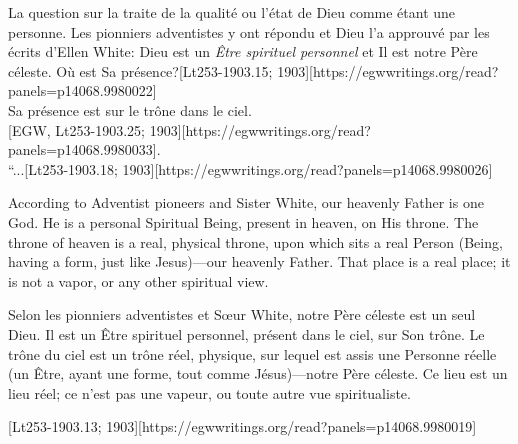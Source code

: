 La question sur la  traite de la qualité ou l'état de Dieu comme étant une personne. Les pionniers adventistes y ont répondu et Dieu l'a approuvé par les écrits d'Ellen White: Dieu est un \textit{Être spirituel personnel} et Il est notre Père céleste. Où est Sa présence?[Lt253-1903.15; 1903][https://egwwritings.org/read?panels=p14068.9980022] \\
Sa présence est sur le trône dans le ciel. \\
[EGW, Lt253-1903.25; 1903][https://egwwritings.org/read?panels=p14068.9980033]. \\
“...[Lt253-1903.18; 1903][https://egwwritings.org/read?panels=p14068.9980026]


According to Adventist pioneers and Sister White, our heavenly Father is one God. He is a personal Spiritual Being, present in heaven, on His throne. The throne of heaven is a real, physical throne, upon which sits a real Person (Being, having a form, just like Jesus)—our heavenly Father. That place is a real place; it is not a vapor, or any other spiritual view.


Selon les pionniers adventistes et Sœur White, notre Père céleste est un seul Dieu. Il est un Être spirituel personnel, présent dans le ciel, sur Son trône. Le trône du ciel est un trône réel, physique, sur lequel est assis une Personne réelle (un Être, ayant une forme, tout comme Jésus)—notre Père céleste. Ce lieu est un lieu réel; ce n'est pas une vapeur, ou toute autre vue spiritualiste.


[Lt253-1903.13; 1903][https://egwwritings.org/read?panels=p14068.9980019]


